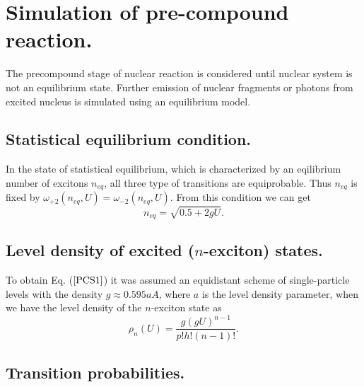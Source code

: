 \section{Simulation of pre-compound reaction.}

\hspace{1.0em}The precompound stage of 
nuclear reaction is considered until nuclear 
system is not an equilibrium state. 
Further emission of nuclear fragments or photons from excited 
nucleus is simulated using an equilibrium 
 model. 


\subsection{Statistical equilibrium condition.}

\hspace{1.0em}In the state of statistical equilibrium, which is
characterized by an eqilibrium number of excitons $n_{eq}$, all three
type of transitions are equiprobable. Thus $n_{eq}$ is fixed by
$\omega_{+2}(n_{eq},U) = \omega_{-2}(n_{eq},U)$. From this condition we
can get
\begin{equation}
\label{PCS1}n_{eq} = \sqrt{0.5+ 2gU}.
\end{equation}

\subsection{Level density of excited ($n$-exciton) states.}

\hspace{1.0em}To obtain Eq. ($\ref{PCS1}$) it was assumed an equidistant 
scheme of single-particle levels with the density $g \approx 0.595 aA$,
where $a$ is the level density parameter, when we have the level density
of the $n$-exciton state as
\begin{equation}
\label{PCS2} \rho_{n}(U) = \frac{g(gU)^{n-1}}{p!h!(n-1)!}.
\end{equation}

\subsection{Transition probabilities.} 


